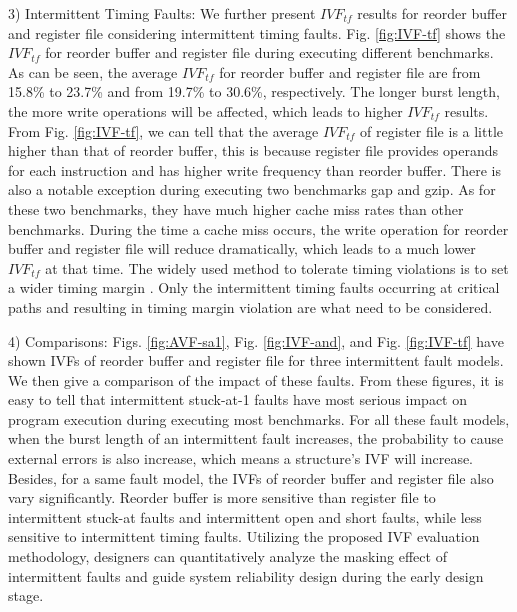 3) Intermittent Timing Faults: We further present $IVF_{tf}$ results for reorder buffer and register file considering intermittent timing faults. Fig. \ref{fig:IVF-tf} shows the $IVF_{tf}$ for reorder buffer and register file during executing different benchmarks. As can be seen, the average $IVF_{tf}$ for reorder buffer and register file are from 15.8\% to 23.7\% and from 19.7\% to 30.6\%, respectively. The longer burst length, the more write operations will be affected, which leads to higher $IVF_{tf}$ results. From Fig. \ref{fig:IVF-tf}, we can tell that the average $IVF_{tf}$ of register file is a little higher than that of reorder buffer, this is because register file provides operands for each instruction and has higher write frequency than reorder buffer. There is also a notable exception during executing two benchmarks gap and gzip. As for these two benchmarks, they have much higher cache miss rates than other benchmarks. During the time a cache miss occurs, the write operation for reorder buffer and register file will reduce dramatically, which leads to a much lower $IVF_{tf}$ at that time. The widely used method to tolerate timing violations is to set a wider timing margin \cite{annavaram2007implications}. Only the intermittent timing faults occurring at critical paths and resulting in timing margin violation are what need to be considered.

4) Comparisons: Figs. \ref{fig:AVF-sa1}, Fig. \ref{fig:IVF-and}, and Fig. \ref{fig:IVF-tf} have shown IVFs of reorder buffer and register file for three intermittent fault models. We then give a comparison of the impact of these faults. From these figures, it is easy to tell that intermittent stuck-at-1 faults have most serious impact on program execution during executing most benchmarks. For all these fault models, when the burst length of an intermittent fault increases, the probability to cause external errors is also increase, which means a structure’s IVF will increase. Besides, for a same fault model, the IVFs of reorder buffer and register file also vary significantly. Reorder buffer is more sensitive than register file to intermittent stuck-at faults and intermittent open and short faults, while less sensitive to intermittent timing faults. Utilizing the proposed IVF evaluation methodology, designers can quantitatively analyze the masking effect of intermittent faults and guide system reliability design during the early design stage.

